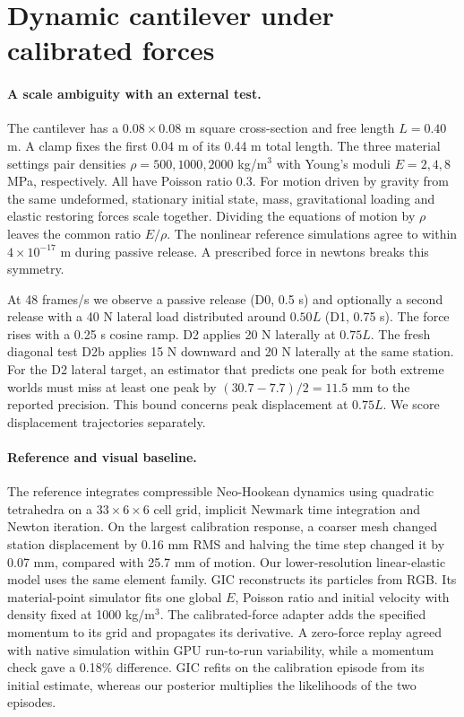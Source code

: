 \section{Dynamic cantilever under calibrated forces}
\label{sec:supp-dynamic-stem}

\paragraph{A scale ambiguity with an external test.}
The cantilever has a $0.08\times0.08$ m square cross-section and free length $L=0.40$ m. A clamp fixes the first 0.04 m of its 0.44 m total length. The three material settings pair densities $\rho=500,1000,2000$ kg/m$^3$ with Young's moduli $E=2,4,8$ MPa, respectively. All have Poisson ratio 0.3. For motion driven by gravity from the same undeformed, stationary initial state, mass, gravitational loading and elastic restoring forces scale together. Dividing the equations of motion by $\rho$ leaves the common ratio $E/\rho$. The nonlinear reference simulations agree to within $4\times10^{-17}$ m during passive release. A prescribed force in newtons breaks this symmetry.

At 48 frames/s we observe a passive release (D0, 0.5 s) and optionally a second release with a 40 N lateral load distributed around $0.50L$ (D1, 0.75 s). The force rises with a 0.25 s cosine ramp. D2 applies 20 N laterally at $0.75L$. The fresh diagonal test D2b applies 15 N downward and 20 N laterally at the same station. For the D2 lateral target, an estimator that predicts one peak for both extreme worlds must miss at least one peak by $(30.7-7.7)/2=11.5$ mm to the reported precision. This bound concerns peak displacement at $0.75L$. We score displacement trajectories separately.

\paragraph{Reference and visual baseline.}
The reference integrates compressible Neo-Hookean dynamics using quadratic tetrahedra on a $33\times6\times6$ cell grid, implicit Newmark time integration and Newton iteration. On the largest calibration response, a coarser mesh changed station displacement by 0.16 mm RMS and halving the time step changed it by 0.07 mm, compared with 25.7 mm of motion. Our lower-resolution linear-elastic model uses the same element family. GIC reconstructs its particles from RGB. Its material-point simulator fits one global $E$, Poisson ratio and initial velocity with density fixed at 1000 kg/m$^3$. The calibrated-force adapter adds the specified momentum to its grid and propagates its derivative. A zero-force replay agreed with native simulation within GPU run-to-run variability, while a momentum check gave a 0.18\% difference. GIC refits on the calibration episode from its initial estimate, whereas our posterior multiplies the likelihoods of the two episodes.

